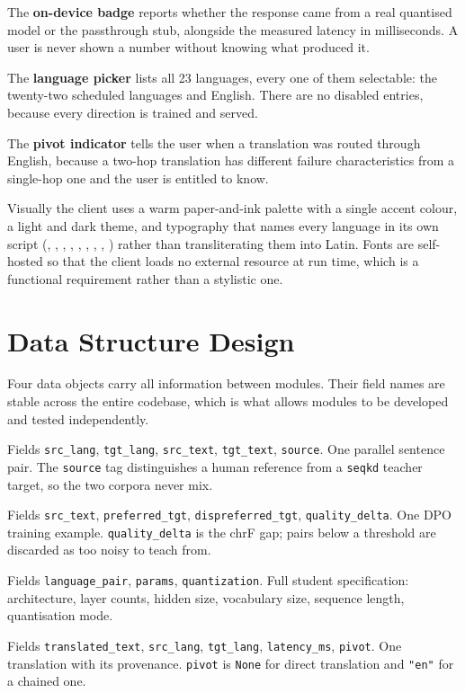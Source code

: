 The \textbf{on-device badge} reports whether the response came from a real
quantised model or the passthrough stub, alongside the measured latency in
milliseconds. A user is never shown a number without knowing what produced it.

The \textbf{language picker} lists all 23 languages, every one of them
selectable: the twenty-two scheduled languages and English. There are no
disabled entries, because every direction is trained and served.

The \textbf{pivot indicator} tells the user when a translation was routed
through English, because a two-hop translation has different failure
characteristics from a single-hop one and the user is entitled to know.

Visually the client uses a warm paper-and-ink palette with a single accent
colour, a light and dark theme, and typography that names every language in its
own script (, , , ,
, , , , ) rather
than transliterating them into Latin. Fonts are self-hosted so that the client
loads no external resource at run time, which is a functional requirement rather
than a stylistic one.

\section{Data Structure Design}
\label{sec:datastructures}

Four data objects carry all information between modules. Their field names are
stable across the entire codebase, which is what allows modules to be developed
and tested independently.

\begin{terms}
\item[\texttt{CorpusEntry}] Fields \texttt{src\_lang}, \texttt{tgt\_lang}, \texttt{src\_text}, \texttt{tgt\_text}, \texttt{source}. One parallel sentence pair. The \texttt{source} tag distinguishes a human reference from a \texttt{seqkd} teacher target, so the two corpora never mix.
\item[\texttt{PreferencePair}] Fields \texttt{src\_text}, \texttt{preferred\_tgt}, \texttt{dispreferred\_tgt}, \texttt{quality\_delta}. One DPO training example. \texttt{quality\_delta} is the chrF gap; pairs below a threshold are discarded as too noisy to teach from.
\item[\texttt{ModelConfig}] Fields \texttt{language\_pair}, \texttt{params}, \texttt{quantization}. Full student specification: architecture, layer counts, hidden size, vocabulary size, sequence length, quantisation mode.
\item[\texttt{TranslationResult}] Fields \texttt{translated\_text}, \texttt{src\_lang}, \texttt{tgt\_lang}, \texttt{latency\_ms}, \texttt{pivot}. One translation with its provenance. \texttt{pivot} is \texttt{None} for direct translation and \texttt{"en"} for a chained one.
\end{terms}

